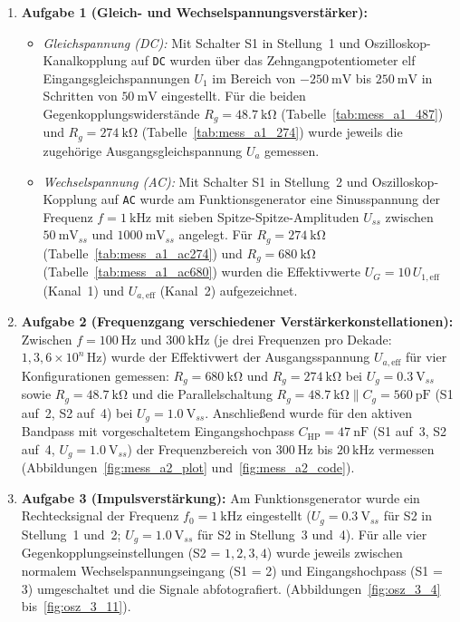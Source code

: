 \documentclass[12pt,a4paper,titlepage]{scrartcl}
\numberwithin{equation}{section}
\numberwithin{table}{section}
\numberwithin{figure}{section}
\begin{document}
\begin{enumerate}
    \item \textbf{Aufgabe 1 (Gleich- und Wechselspannungsverstärker):}
    \begin{itemize}
        \item \emph{Gleichspannung (DC):} Mit Schalter S1 in Stellung~1 und Oszilloskop-Kanalkopplung auf \texttt{DC} wurden über das Zehngangpotentiometer elf Eingangsgleichspannungen $U_1$ im Bereich von $\SI{-250}{\milli\volt}$ bis $\SI{+250}{\milli\volt}$ in Schritten von $\SI{50}{\milli\volt}$ eingestellt. Für die beiden Gegenkopplungswiderstände $R_g = \SI{48.7}{\kilo\ohm}$ (Tabelle~\ref{tab:mess_a1_487}) und $R_g = \SI{274}{\kilo\ohm}$ (Tabelle~\ref{tab:mess_a1_274}) wurde jeweils die zugehörige Ausgangsgleichspannung $U_a$ gemessen.
        \item \emph{Wechselspannung (AC):} Mit Schalter S1 in Stellung~2 und Oszilloskop-Kopplung auf \texttt{AC} wurde am Funktionsgenerator eine Sinusspannung der Frequenz $f = \SI{1}{\kilo\hertz}$ mit sieben Spitze-Spitze-Amplituden $U_{ss}$ zwischen $\SI{50}{\milli\volt_{ss}}$ und $\SI{1000}{\milli\volt_{ss}}$ angelegt. Für $R_g = \SI{274}{\kilo\ohm}$ (Tabelle~\ref{tab:mess_a1_ac274}) und $R_g = \SI{680}{\kilo\ohm}$ (Tabelle~\ref{tab:mess_a1_ac680}) wurden die Effektivwerte $U_G = 10\,U_{1,\text{eff}}$ (Kanal~1) und $U_{a,\text{eff}}$ (Kanal~2) aufgezeichnet.
    \end{itemize}
    \item \textbf{Aufgabe 2 (Frequenzgang verschiedener Verstärkerkonstellationen):}
    Zwischen $f = \SI{100}{\hertz}$ und $\SI{300}{\kilo\hertz}$ (je drei Frequenzen pro Dekade: $1, 3, 6 \times 10^n\,\si{\hertz}$) wurde der Effektivwert der Ausgangsspannung $U_{a,\text{eff}}$ für vier Konfigurationen gemessen: $R_g = \SI{680}{\kilo\ohm}$ und $R_g = \SI{274}{\kilo\ohm}$ bei $U_g = \SI{0.3}{\volt_{ss}}$ sowie $R_g = \SI{48.7}{\kilo\ohm}$ und die Parallelschaltung $R_g = \SI{48.7}{\kilo\ohm} \parallel C_g = \SI{560}{\pico\farad}$ (S1 auf~2, S2 auf~4) bei $U_g = \SI{1.0}{\volt_{ss}}$. Anschließend wurde für den aktiven Bandpass mit vorgeschaltetem Eingangshochpass $C_{\text{HP}} = \SI{47}{\nano\farad}$ (S1 auf~3, S2 auf~4, $U_g = \SI{1.0}{\volt_{ss}}$) der Frequenzbereich von $\SI{300}{\hertz}$ bis $\SI{20}{\kilo\hertz}$ vermessen (Abbildungen~\ref{fig:mess_a2_plot} und~\ref{fig:mess_a2_code}).
    \item \textbf{Aufgabe 3 (Impulsverstärkung):}
    Am Funktionsgenerator wurde ein Rechtecksignal der Frequenz $f_0 = \SI{1}{\kilo\hertz}$ eingestellt ($U_g = \SI{0.3}{\volt_{ss}}$ für S2 in Stellung~1 und~2; $U_g = \SI{1.0}{\volt_{ss}}$ für S2 in Stellung~3 und~4). Für alle vier Gegenkopplungseinstellungen (S2 = $1, 2, 3, 4$) wurde jeweils zwischen normalem Wechselspannungseingang (S1 = 2) und Eingangshochpass (S1 = 3) umgeschaltet und die Signale abfotografiert. (Abbildungen~\ref{fig:osz_3_4} bis~\ref{fig:osz_3_11}).
\end{enumerate}
\end{document}
